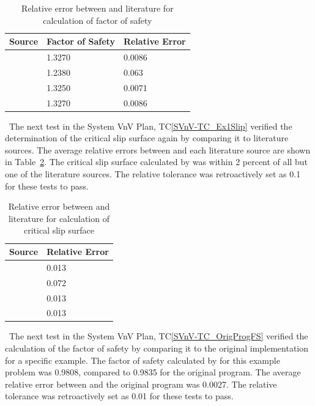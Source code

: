 \documentclass[12pt, titlepage]{article}
\newcommand{\tcref}[1]{TC\ref{#1}}
\begin{document}
\begin{table}[!h]
\begin{tabularx}{1.0\textwidth}{p{7cm} l l}
	\toprule \textbf{Source} & \textbf{Factor of Safety} & \textbf{Relative 
	Error}\\ \midrule
	\cite{Greco1996} & 1.3270 & 0.0086\\
	\cite{MalkawiEtAl} & 1.2380 & 0.063\\
	\cite{ChengEtAl} & 1.3250 & 0.0071\\
	\cite{LiEtAl} & 1.3270 & 0.0086\\
	\bottomrule
\end{tabularx}
\caption{Relative error between \progname{} and literature for calculation of 
factor of safety}
\label{Table:LitFS}
\end{table}

~\newline \noindent The next test in the System VnV Plan, 
\tcref{SVnV-TC_Ex1Slip} 
verified the determination of the critical slip surface again by comparing it 
to literature sources. The average relative errors between \progname{} and each 
literature source are shown in Table~\ref{Table:LitSlip}. The critical slip 
surface calculated by \progname{} was within 2 percent of all but one of the 
literature sources. The relative tolerance was retroactively set as 0.1 for 
these tests to pass.

\begin{table}[!h]
\begin{tabularx}{1.0\textwidth}{l p{3.5cm}}
	\toprule \textbf{Source} & \textbf{Relative Error}\\ \midrule
	\cite{Greco1996} & 0.013\\
	\cite{MalkawiEtAl} & 0.072\\
	\cite{ChengEtAl} & 0.013\\
	\cite{LiEtAl} & 0.013\\
	\bottomrule
\end{tabularx}
\caption{Relative error between \progname{} and literature for calculation of 
critical slip surface}
\label{Table:LitSlip}
\end{table}

~\newline \noindent The next test in the System VnV Plan, 
\tcref{SVnV-TC_OrigProgFS} 
verified the calculation of the factor of safety by comparing it to the 
original implementation for a specific example. The factor of safety calculated 
by \progname{} for this example problem was 0.9808, compared to 0.9835 for the 
original program. The average relative error between \progname{} and the 
original 
program was 0.0027. The relative tolerance was retroactively set as 0.01 for 
these tests to pass.
\end{document}
